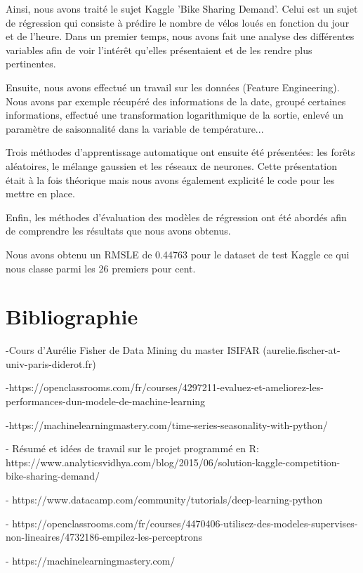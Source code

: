 \documentclass[a4paper,oneside,11pt]{article}
\begin{document}
\qquad Ainsi, nous avons traité le sujet Kaggle 'Bike Sharing Demand'. Celui est un sujet de régression qui consiste à prédire le nombre de vélos loués en fonction du jour et de l'heure.
Dans un premier temps, nous avons fait une analyse des différentes variables afin de voir l'intérêt qu'elles présentaient et de les rendre plus pertinentes.

\qquad Ensuite, nous avons effectué un travail sur les données (Feature Engineering). Nous avons par exemple récupéré des informations de la date, groupé certaines informations, effectué une transformation logarithmique de la sortie, enlevé un paramètre de saisonnalité dans la variable de température...

\qquad Trois méthodes d'apprentissage automatique ont ensuite été présentées: les forêts aléatoires, le mélange gaussien et les réseaux de neurones. Cette présentation était à la fois théorique mais nous avons également explicité le code pour les mettre en place.

\qquad Enfin, les méthodes d'évaluation des modèles de régression ont été abordés afin de comprendre les résultats que nous avons obtenus.

\qquad Nous avons obtenu un RMSLE de 0.44763 pour le dataset de test Kaggle ce qui nous classe parmi les 26 premiers pour cent.
  
\newpage
\part*{Bibliographie}
%

-Cours d'Aurélie Fisher de Data Mining du master ISIFAR (aurelie.fischer-at-univ-paris-diderot.fr)

-https://openclassrooms.com/fr/courses/4297211-evaluez-et-ameliorez-les-performances-dun-modele-de-machine-learning

-https://machinelearningmastery.com/time-series-seasonality-with-python/

- Résumé et idées de travail sur le projet programmé en R: https://www.analyticsvidhya.com/blog/2015/06/solution-kaggle-competition-bike-sharing-demand/

- https://www.datacamp.com/community/tutorials/deep-learning-python

- https://openclassrooms.com/fr/courses/4470406-utilisez-des-modeles-supervises-non-lineaires/4732186-empilez-les-perceptrons

- https://machinelearningmastery.com/
\end{document}
